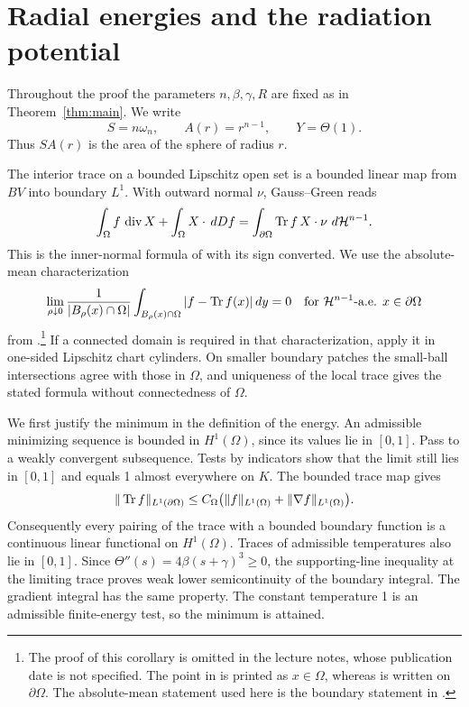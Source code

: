 \section{Radial energies and the radiation potential}\label{sec:radial}

Throughout the proof the parameters \(n,\beta,\gamma,R\) are fixed as in
Theorem~\ref{thm:main}. We write
\[
 S=n\omega_n,\qquad A(r)=r^{n-1},\qquad Y=\Theta(1).
\]
Thus \(S A(r)\) is the area of the sphere of radius \(r\).

The interior trace on a bounded Lipschitz open set is a bounded linear
map from \(BV\) into boundary \(L^1\). With outward normal \(\nu\),
Gauss--Green reads
\[
 \int_\Omega f\,\operatorname{div}X+\int_\Omega X\cdot\,d Df
 =\int_{\partial\Omega}\operatorname{Tr} f\,X\cdot\nu\,\,d\mathcal H^{n-1}.
\]
This is the inner-normal formula of \cite[Theorem~2.9]{LV} with its sign
converted. We use the absolute-mean characterization
\[
 \lim_{\rho\downarrow0}\frac1{|B_\rho(x)\cap\Omega|}
 \int_{B_\rho(x)\cap\Omega}|f-\operatorname{Tr} f(x)|\,d y=0
 \quad\text{for }\mathcal H^{n-1}\text{-a.e. }x\in\partial\Omega
\]
from \cite[Corollary~1.29]{Gorny}.\footnote{The proof of this
corollary is omitted in the lecture notes, whose publication date is
not specified. The point in \cite[(2.5)]{LV} is printed as \(x\in\Omega\),
whereas \cite[(2.6)]{LV} is written on \(\partial\Omega\). The
absolute-mean statement used here is the boundary statement in
\cite[Corollary~1.29]{Gorny}.}
If a connected domain is required in that characterization, apply it
in one-sided Lipschitz chart cylinders. On smaller boundary patches the
small-ball intersections agree with those in \(\Omega\), and uniqueness
of the local trace gives the stated formula without connectedness of
\(\Omega\).


We first justify the minimum in the definition of the energy. An admissible
minimizing sequence is bounded in \(H^1(\Omega)\), since its values lie in
\([0,1]\). Pass to a weakly convergent subsequence. Tests by indicators show
that the limit still lies in \([0,1]\) and equals 1 almost everywhere on \(K\).
The bounded trace map gives
\[
 \|\operatorname{Tr} f\|_{L^1(\partial\Omega)}
 \le C_\Omega\bigl(\|f\|_{L^1(\Omega)}+\|\nabla f\|_{L^1(\Omega)}\bigr).
\]
Consequently every pairing of the trace with a bounded boundary function
is a continuous linear functional on \(H^1(\Omega)\). Traces of admissible
temperatures also lie in \([0,1]\). Since
\(\Theta''(s)=4\beta(s+\gamma)^3\ge0\), the supporting-line inequality at
the limiting trace proves weak lower semicontinuity of the boundary
integral. The gradient integral has the same property. The constant
temperature 1 is an admissible finite-energy test, so the minimum is attained.


